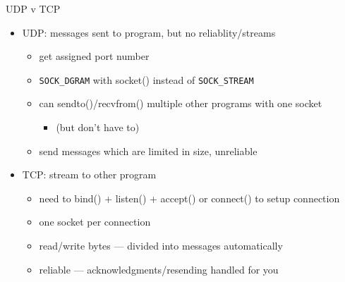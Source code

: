 \begin{frame}[fragile]{UDP v TCP}
    \begin{itemize}
    \item UDP: messages sent to program, but no reliablity/streams
        \begin{itemize}
        \item get assigned port number
        \item \texttt{SOCK\_DGRAM} with socket() instead of \texttt{SOCK\_STREAM}
        \item can sendto()/recvfrom() multiple other programs with one socket
            \begin{itemize}
            \item (but don't have to)
            \end{itemize}
        \item send messages which are limited in size, unreliable
        \end{itemize}
    \item TCP: stream to other program
        \begin{itemize}
        \item need to bind() + listen() + accept() or connect() to setup connection
        \item one socket per connection
        \item read/write bytes --- divided into messages automatically
        \item reliable --- acknowledgments/resending handled for you
        \end{itemize}
    \end{itemize}
\end{frame}
